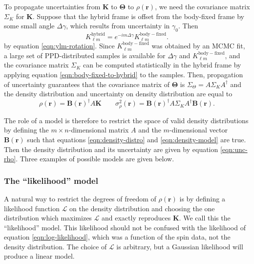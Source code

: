 To propagate uncertainties from $\bm K$ to $\bm \Theta$ to $\rho(\bm r)$, we need the covariance matrix $\Sigma_K$ for $\bm K$. Suppose that the hybrid frame is offset from the body-fixed frame by some small angle $\Delta \gamma$, which results from uncertainty in $\gamma_0$. Then
\begin{equation}
  K_{\ell m}^\mathrm{hybrid} = e^{-im\Delta \gamma}K_{\ell m}^\mathrm{body-fixed}.
  \label{eqn:body-fixed-to-hybrid}
\end{equation}
by equation \ref{eqn:ylm-rotation}. Since $K_{\ell m}^\mathrm{body-fixed}$ was obtained by an MCMC fit, a large set of PPD-distributed samples is available for $\Delta \gamma$ and $K_{\ell m}^\mathrm{body-fixed}$, and the covariance matrix $\Sigma_K$ can be computed statistically in the hybrid frame by applying equation \ref{eqn:body-fixed-to-hybrid} to the samples. Then, propagation of uncertainty guarantees that the covariance matrix of $\bm \Theta$ is $\Sigma_\Theta = A \Sigma_K A^\dagger$ and the density distribution and uncertainty on density distribution are equal to
\begin{equation}
  \rho(\bm r) = \bm B(\bm r)^\dagger A\bm K \qquad \sigma^2_\rho(\bm r) = \bm B(\bm r)^\dagger A \Sigma_K A^\dagger \bm B(\bm r).
  \label{eqn:unc-rho}
\end{equation}

The role of a model is therefore to restrict the space of valid density distributions by defining the $m\times n$-dimensional matrix $A$ and the $m$-dimensional vector $\bm B(\bm r)$ such that equations \ref{eqn:density-distro} and \ref{eqn:density-model} are true. Then the density distribution and its uncertainty are given by equation \ref{eqn:unc-rho}. Three examples of possible models are given below.


\subsubsection{The ``likelihood'' model}
\label{sec:likelihood}

A natural way to restrict the degrees of freedom of $\rho(\bm r)$ is by defining a likelihood function $\mathcal{L}$ on the density distribution and choosing the one distribution which maximizes $\mathcal{L}$ and exactly reproduces $\bm K$. We call this the ``likelihood'' model. This likelihood should not be confused with the likelihood of equation \ref{eqn:log-likelihood}, which was a function of the spin data, not the density distribution. The choice of $\mathcal{L}$ is arbitrary, but a Gaussian likelihood will produce a linear model.

